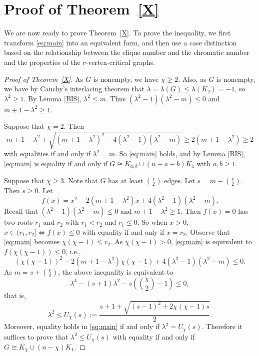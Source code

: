 \documentclass[10pt,a4paper]{amsart}
\begin{document}
\section{Proof of Theorem~\ref{X}}

We are now ready to prove Theorem~\ref{X}. To prove the inequality, we first transform \eqref{eq:main} into an equivalent form, and then use a case distinction based on the relationship between the clique number and the chromatic number  and the properties of the $r$-vertex-critical graphs.


\begin{proof}[Proof of Theorem~\ref{X}]
%

 
As $G$ is nonempty, we have $\chi\ge 2$. Also, as $G$ is nonempty,  we have by Cauchy's interlacing theorem that $\lambda=\lambda (G)\le \lambda(K_2)= -1$, so $\lambda^2\ge 1$. By Lemma \ref{BIS}, $\lambda^2\le m$. Thus
 $(\lambda^2-1)(\lambda^2-m)\le 0$ and $m+1-\lambda^2\ge 1$. 


Suppose that $\chi=2$. Then \[
m+1-\lambda^2+\sqrt{(m+1-\lambda^2)^2-4(\lambda^2-1)(\lambda^2-m)}\ge 2(m+1-\lambda^2)\ge 2
\]
with equalities if and only if $\lambda^2=m$. So \eqref{eq:main} holds, and  by Lemma \ref{BIS}, 
\eqref{eq:main} is equality if and only if $G\cong K_{a,b}\cup (n-a-b)K_1$ with $a,b\ge 1$.

Suppose that $\chi\ge 3$. 
Note that $G$ has at least $\binom{\chi}{2}$ edges. Let $s = m-\binom{\chi}{2}$. Then $s\ge 0$. Let 
\[
f(x)=x^2 - 2(m+1-\lambda^2)x + 4(\lambda^2-1)(\lambda^2-m).
\]
Recall that  $(\lambda^2-1)(\lambda^2-m)\le 0$ and $m+1-\lambda^2\ge 1$. 
Then $f(x)=0$ has two roots $r_1$ and $r_2$ with $r_1< r_2$ and $r_1\le 0$. So when $x>0$, $x\in (r_1,r_2] \iff f(x)\le 0$ with equality if and only if $x=r_2$. 
Observe  that  \eqref{eq:main} becomes $\chi(\chi-1)\le r_2$. 
As $\chi(\chi-1)>0$, \eqref{eq:main} is equivalent to $f(\chi(\chi-1))\le 0$, i.e.,
\[
(\chi(\chi-1))^2-2(m+1-\lambda^2)\chi(\chi-1)+4(\lambda^2-1)(\lambda^2-m)\le 0.
\]
As $m=s+{\chi \choose 2}$, the above inequality is equivalent to 
\[
\lambda^4-(s+1)\lambda^2-s\left({\chi \choose 2}-1\right)\le 0,
\] 
that is, 
\[
\lambda^2 \le U_\chi(s) := \frac{s+1+\sqrt{(s-1)^2 + 2\chi(\chi-1)s}}{2}.
\]
Moreover, equality holds in \eqref{eq:main}  if and only if $\lambda^2= U_\chi(s)$. Therefore it suffices to prove that $\lambda^2 \le U_\chi(s)$ with equality if and only if $G\cong K_\chi \cup (n-\chi)K_1$.



\end{proof}
\end{document}
